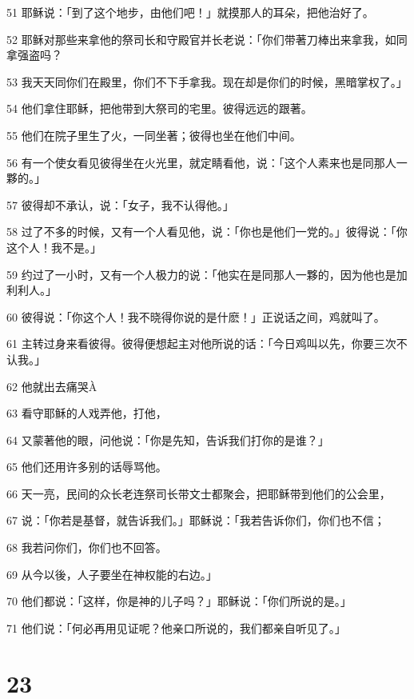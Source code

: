 \par 51 耶稣说：「到了这个地步，由他们吧！」就摸那人的耳朵，把他治好了。
\par 52 耶稣对那些来拿他的祭司长和守殿官并长老说：「你们带著刀棒出来拿我，如同拿强盗吗？
\par 53 我天天同你们在殿里，你们不下手拿我。现在却是你们的时候，黑暗掌权了。」
\par 54 他们拿住耶稣，把他带到大祭司的宅里。彼得远远的跟著。
\par 55 他们在院子里生了火，一同坐著；彼得也坐在他们中间。
\par 56 有一个使女看见彼得坐在火光里，就定睛看他，说：「这个人素来也是同那人一夥的。」
\par 57 彼得却不承认，说：「女子，我不认得他。」
\par 58 过了不多的时候，又有一个人看见他，说：「你也是他们一党的。」彼得说：「你这个人！我不是。」
\par 59 约过了一小时，又有一个人极力的说：「他实在是同那人一夥的，因为他也是加利利人。」
\par 60 彼得说：「你这个人！我不晓得你说的是什麽！」正说话之间，鸡就叫了。
\par 61 主转过身来看彼得。彼得便想起主对他所说的话：「今日鸡叫以先，你要三次不认我。」
\par 62 他就出去痛哭À
\par 63 看守耶稣的人戏弄他，打他，
\par 64 又蒙著他的眼，问他说：「你是先知，告诉我们打你的是谁？」
\par 65 他们还用许多别的话辱骂他。
\par 66 天一亮，民间的众长老连祭司长带文士都聚会，把耶稣带到他们的公会里，
\par 67 说：「你若是基督，就告诉我们。」耶稣说：「我若告诉你们，你们也不信；
\par 68 我若问你们，你们也不回答。
\par 69 从今以後，人子要坐在神权能的右边。」
\par 70 他们都说：「这样，你是神的儿子吗？」耶稣说：「你们所说的是。」
\par 71 他们说：「何必再用见证呢？他亲口所说的，我们都亲自听见了。」

\chapter{23}

